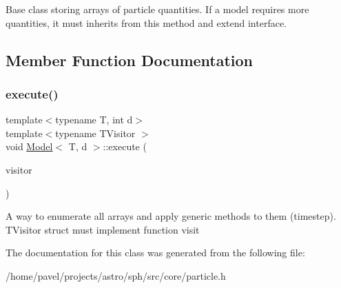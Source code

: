 Base class storing arrays of particle quantities. If a model requires more quantities, it must inherits from this method and extend interface. 

\subsection{Member Function Documentation}
\hypertarget{classModel_a9cfb34e778da5c1b6a44929ca2430c34}{}\label{classModel_a9cfb34e778da5c1b6a44929ca2430c34} 
\subsubsection{\texorpdfstring{execute()}{execute()}}
{\footnotesize\ttfamily template$<$typename T, int d$>$ \\
template$<$typename T\+Visitor $>$ \\
void \hyperlink{classModel}{Model}$<$ T, d $>$\+::execute (\begin{DoxyParamCaption}\item[{T\+Visitor \&\&}]{visitor }\end{DoxyParamCaption})\hspace{0.3cm}{\ttfamily [inline]}}

A way to enumerate all arrays and apply generic methods to them (timestep). T\+Visitor struct must implement function visit 

The documentation for this class was generated from the following file\+:\begin{DoxyCompactItemize}
\item 
/home/pavel/projects/astro/sph/src/core/particle.\+h\end{DoxyCompactItemize}
